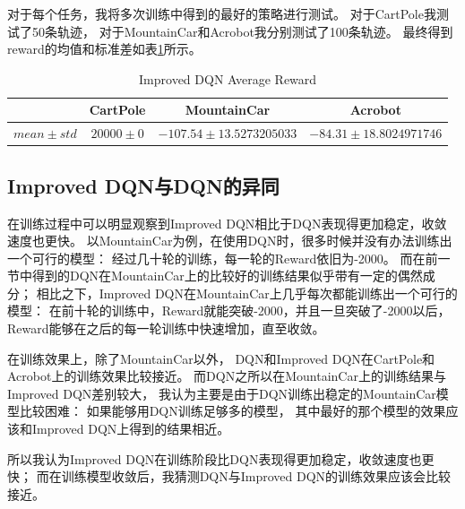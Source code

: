 \documentclass[a4paper,UTF8]{article}
\theoremstyle{definition}
\begin{document}
对于每个任务，我将多次训练中得到的最好的策略进行测试。
对于CartPole我测试了50条轨迹，
对于MountainCar和Acrobot我分别测试了100条轨迹。
最终得到reward的均值和标准差如表\ref{tab:reward-idqn}所示。

\begin{table}[H]
	\centering
	\caption{Improved DQN Average Reward}\label{tab:reward-idqn}
	\begin{tabular}{c|ccc}
		\toprule
		& CartPole & MountainCar & Acrobot \\
		\midrule
		$mean \pm std$ & $20000 \pm 0$ & $-107.54 \pm 13.5273205033$ & $-84.31 \pm 18.8024971746$ \\
		\bottomrule
	\end{tabular}
\end{table}

\subsection*{Improved DQN与DQN的异同}

在训练过程中可以明显观察到Improved DQN相比于DQN表现得更加稳定，收敛速度也更快。
以MountainCar为例，在使用DQN时，很多时候并没有办法训练出一个可行的模型：
经过几十轮的训练，每一轮的Reward依旧为-2000。
而在前一节中得到的DQN在MountainCar上的比较好的训练结果似乎带有一定的偶然成分；
相比之下，Improved DQN在MountainCar上几乎每次都能训练出一个可行的模型：
在前十轮的训练中，Reward就能突破-2000，并且一旦突破了-2000以后，
Reward能够在之后的每一轮训练中快速增加，直至收敛。

在训练效果上，除了MountainCar以外，
DQN和Improved DQN在CartPole和Acrobot上的训练效果比较接近。
而DQN之所以在MountainCar上的训练结果与Improved DQN差别较大，
我认为主要是由于DQN训练出稳定的MountainCar模型比较困难：
如果能够用DQN训练足够多的模型，
其中最好的那个模型的效果应该和Improved DQN上得到的结果相近。

所以我认为Improved DQN在训练阶段比DQN表现得更加稳定，收敛速度也更快；
而在训练模型收敛后，我猜测DQN与Improved DQN的训练效果应该会比较接近。
\end{document}
